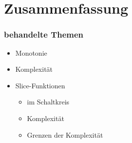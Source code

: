 \documentclass[hyperref={pdfpagelabels=false}]{beamer} %
\begin{document}
  \section{Zusammenfassung}
  \begin{frame}
    \frametitle{behandelte Themen}
    \begin{itemize}
      \item Monotonie
      \item Komplexität
      \item Slice-Funktionen
      \begin{itemize}
        \item im Schaltkreis
        \item Komplexität
        \item Grenzen der Komplexität
      \end{itemize}
    \end{itemize}
  \end{frame}
\end{document}
